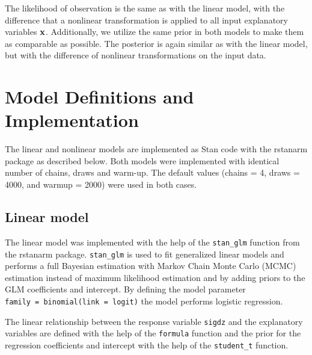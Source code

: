 \documentclass[
  letterpaper,
  DIV=11,
  numbers=noendperiod]{scrartcl}
\begin{document}
The likelihood of observation is the same as with the linear model, with
the difference that a nonlinear transformation is applied to all input
explanatory variables \(\bf{x}\). Additionally, we utilize the same
prior in both models to make them as comparable as possible. The
posterior is again similar as with the linear model, but with the
difference of nonlinear transformations on the input data.

\hypertarget{model-definitions-and-implementation}{%
\section{Model Definitions and
Implementation}\label{model-definitions-and-implementation}}

The linear and nonlinear models are implemented as Stan code with the
rstanarm package as described below. Both models were implemented with
identical number of chains, draws and warm-up. The default values
(chains = 4, draws = 4000, and warmup = 2000) were used in both cases.

\hypertarget{linear-model}{%
\subsection{Linear model}\label{linear-model}}

The linear model was implemented with the help of the \texttt{stan\_glm}
function from the rstanarm package. \texttt{stan\_glm} is used to fit
generalized linear models and performs a full Bayesian estimation with
Markov Chain Monte Carlo (MCMC) estimation instead of maximum likelihood
estimation and by adding priors to the GLM coefficients and intercept.
By defining the model parameter
\texttt{family\ =\ binomial(link\ =\ \textquotesingle{}logit\textquotesingle{})}
the model performs logistic regression.

The linear relationship between the response variable \texttt{sigdz} and
the explanatory variables are defined with the help of the
\texttt{formula} function and the prior for the regression coefficients
and intercept with the help of the \texttt{student\_t} function.
\end{document}
